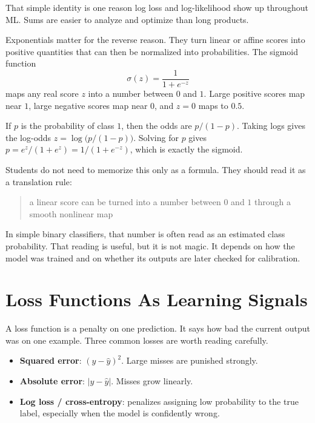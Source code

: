 That simple identity is one reason log loss and log-likelihood show up throughout ML. Sums are easier to analyze and optimize than long products.

Exponentials matter for the reverse reason. They turn linear or affine scores into positive quantities that can then be normalized into probabilities. The sigmoid function
\[
\sigma(z) = \frac{1}{1+e^{-z}}
\]
maps any real score \(z\) into a number between \(0\) and \(1\). Large positive scores map near \(1\), large negative scores map near \(0\), and \(z=0\) maps to \(0.5\).

\begin{mathlens}
If \(p\) is the probability of class \(1\), then the odds are \(p/(1-p)\). Taking logs gives the log-odds \(z=\log\!\bigl(p/(1-p)\bigr)\). Solving for \(p\) gives \(p=e^z/(1+e^z)=1/(1+e^{-z})\), which is exactly the sigmoid.
\end{mathlens}

Students do not need to memorize this only as a formula. They should read it as a translation rule:

\begin{quote}
a linear score can be turned into a number between \(0\) and \(1\) through a smooth nonlinear map
\end{quote}

In simple binary classifiers, that number is often read as an estimated class probability. That reading is useful, but it is not magic. It depends on how the model was trained and on whether its outputs are later checked for calibration.

\section*{Loss Functions As Learning Signals}

A loss function is a penalty on one prediction. It says how bad the current output was on one example. Three common losses are worth reading carefully.

\begin{itemize}[leftmargin=*]
\item \textbf{Squared error}: \((y-\hat{y})^2\). Large misses are punished strongly.
\item \textbf{Absolute error}: \(|y-\hat{y}|\). Misses grow linearly.
\item \textbf{Log loss / cross-entropy}: penalizes assigning low probability to the true label, especially when the model is confidently wrong.
\end{itemize}

